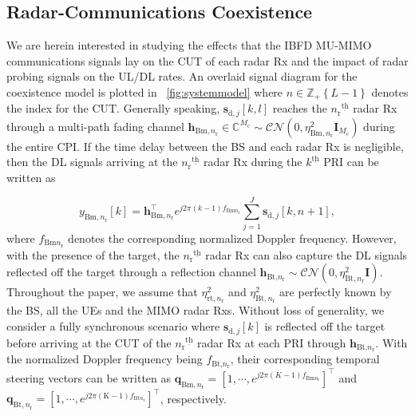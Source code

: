 \documentclass[9pt,journal]{IEEEtran}
\newcommand{\paren}[1]{\left({#1}\right)}
\newcommand{\bracket}[1]{{\left [{#1}\right ]}}
\newcommand{\braces}[1]{{\left\{ {#1}\right\}}}
\newcommand{\ith}[1]    {{#1}^{\underline{\text{th}}}}
\newcommand{\rr}{_\mathrm{r}}
\theoremstyle{definition}
\begin{document}
\subsection{Radar-Communications Coexistence}\label{Coexistence}
We are herein interested in studying the effects that the IBFD MU-MIMO communications signals lay on the CUT of each radar Rx and the impact of radar probing signals on the UL/DL rates. An overlaid signal diagram for the coexistence model is plotted in \figurename{~\ref{fig:systemmodel}} where $n\in\mathbb{Z}_+\braces{\mathit{L}-1}$ denotes the index for the CUT.  Generally speaking, $\mathbf{s}_{\textrm{d},j}\bracket{k,l}$ reaches the $\ith{n\rr}$ radar Rx through a multi-path fading channel $\mathbf{h}_{\mathrm{Bm},n\rr}\in\mathbb{C}^{\mathit{M}_\mathrm{c}}\sim \mathcal{CN}\paren{0,\eta^2_{\textrm{Bm},n\rr}\mathbf{I}_{\mathit{M}_\mathrm{c}}}$ during the entire CPI. If the time delay between the BS and each radar Rx is negligible, then the DL signals arriving at the $\ith{n\rr}$ radar Rx during the $
\ith{k}$ PRI can be written as \par\noindent\small
\begin{equation}
y_{\mathrm{Bm},n\rr}\bracket{k}=\mathbf{h}_{\mathrm{Bm},n\rr}^\top e^{j2\pi\paren{k-1} f_{\mathrm{Bm}n_\mathrm{r}}}
\sum_{j=1}^\mathit{J}\mathbf{s}_{\textrm{d},j}\bracket{k,n+1},
\end{equation}\normalsize
where $f_{\mathrm{Bm}n_\mathrm{r}}$ denotes the corresponding normalized Doppler frequency.  
However, with the presence of the target, the $\ith{n\rr}$ radar Rx can also capture the DL signals reflected off the target through a reflection channel $\mathbf{h}_{\textrm{Bt,}n\rr}\sim\mathcal{CN}\paren{0,\eta^2_{\textrm{Bt},n\rr}\mathbf{I}}$. Throughout the paper, we assume that $\eta^2_{\textrm{rt},n\rr}$ and $\eta^2_{\textrm{Bt},n\rr}$ are perfectly known by the BS, all the UEs and the MIMO radar Rxs. Without loss of generality, we consider a fully synchronous scenario where $\mathbf{s}_{\textrm{d},j}\bracket{k}$ is reflected off the target before arriving at the CUT of the $\ith{n\rr}$ radar Rx at each PRI through $\mathbf{h}_{\textrm{Bt,}n\rr}$.
With the normalized Doppler frequency being $f_{\textrm{Bt,}n\rr}$, 
\iffalse
their corresponding temporal steering vectors can be written as $\mathbf{q}_{\mathrm{Bm},n\rr}=\bracket{1,\cdots,e^{j2\pi\paren{\mathit{K}-1} f_{\mathrm{Bm}n_\mathrm{r}}}}^\top$ and $\mathbf{q}_{\mathrm{Bt},n\rr}=\bracket{1,\cdots,e^{j2\pi\mathrm{\paren{K-1}}f_{\mathrm{Bt}n_\mathrm{r}}}}^\top$, respectively. 
\end{document}

